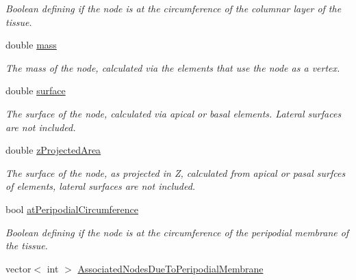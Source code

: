 \begin{DoxyCompactItemize}
\begin{DoxyCompactList}\small\item\em Boolean defining if the node is at the circumference of the columnar layer of the tissue. \end{DoxyCompactList}\item 
\hypertarget{classNode_a63e510fc9158eb15e751861bc14eae38}{}double \hyperlink{classNode_a63e510fc9158eb15e751861bc14eae38}{mass}\label{classNode_a63e510fc9158eb15e751861bc14eae38}

\begin{DoxyCompactList}\small\item\em The mass of the node, calculated via the elements that use the node as a vertex. \end{DoxyCompactList}\item 
\hypertarget{classNode_aab30ea418838635c21593c47f39f2699}{}double \hyperlink{classNode_aab30ea418838635c21593c47f39f2699}{surface}\label{classNode_aab30ea418838635c21593c47f39f2699}

\begin{DoxyCompactList}\small\item\em The surface of the node, calculated via apical or basal elements. Lateral surfaces are not included. \end{DoxyCompactList}\item 
\hypertarget{classNode_af8e9678dfeffc9e99d925a83b58fde3d}{}double \hyperlink{classNode_af8e9678dfeffc9e99d925a83b58fde3d}{z\+Projected\+Area}\label{classNode_af8e9678dfeffc9e99d925a83b58fde3d}

\begin{DoxyCompactList}\small\item\em The surface of the node, as projected in Z, calculated from apical or pasal surfces of elements, lateral surfaces are not included. \end{DoxyCompactList}\item 
\hypertarget{classNode_a7a4b47d88dee36f1fea2721f765c05d0}{}bool \hyperlink{classNode_a7a4b47d88dee36f1fea2721f765c05d0}{at\+Peripodial\+Circumference}\label{classNode_a7a4b47d88dee36f1fea2721f765c05d0}

\begin{DoxyCompactList}\small\item\em Boolean defining if the node is at the circumference of the peripodial membrane of the tissue. \end{DoxyCompactList}\item 
\hypertarget{classNode_a55ffe3c94ccad326737b510b47deff31}{}vector$<$ int $>$ \hyperlink{classNode_a55ffe3c94ccad326737b510b47deff31}{Associated\+Nodes\+Due\+To\+Peripodial\+Membrane}\label{classNode_a55ffe3c94ccad326737b510b47deff31}


\end{DoxyCompactItemize}
